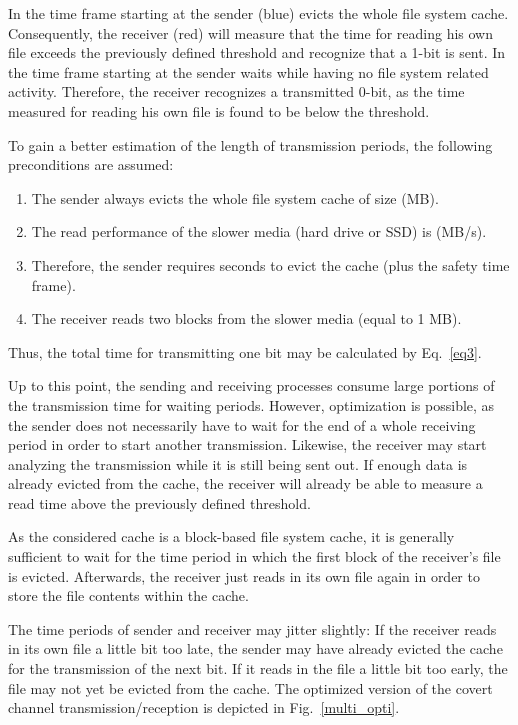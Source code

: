 \documentclass[runningheads,a4paper]{llncs}
\begin{document}
In the time frame starting at  the sender (blue) evicts the whole file system cache. 
Consequently, the receiver (red) will measure that the time for reading his own file exceeds the previously defined threshold and recognize that a 1-bit is sent. 
In the time frame starting at  the sender waits while having no file system related activity. 
Therefore, the receiver recognizes a transmitted 0-bit, as the time measured for reading his own file is found to be below the threshold.

To gain a better estimation of the length of transmission periods, the following preconditions are assumed:

\begin{enumerate}
\item The sender always evicts the whole file system cache of size  (MB). 
\item The read performance of the slower media (hard drive or SSD) is  (MB/s). 
\item Therefore, the sender requires  seconds to evict the cache (plus the safety time frame).
\item The receiver reads two blocks from the slower media (equal to 1 MB). 
\end{enumerate}

Thus, the total time for transmitting one bit may be calculated by Eq.~\ref{eq3}.



Up to this point, the sending and receiving processes consume large portions of the transmission time for waiting periods.
However, optimization is possible, as the sender does not necessarily have to wait for the end of a whole receiving period in order to start another transmission.
Likewise, the receiver may start analyzing the transmission while it is still being sent out.
If enough data is already evicted from the cache, the receiver will already be able to measure a read time above the previously defined threshold.

As the considered cache is a block-based file system cache, it is generally sufficient to wait for the time period in which the first block of the receiver's file is evicted. 
Afterwards, the receiver just reads in its own file again in order to store the file contents within the cache. 

The time periods of sender and receiver may jitter slightly:
If the receiver reads in its own file a little bit too late, the sender may have already evicted the cache for the transmission of the next bit.
If it reads in the file a little bit too early, the file may not yet be evicted from the cache.
The optimized version of the covert channel transmission/reception is depicted in Fig.~\ref{multi_opti}.
\end{document}
